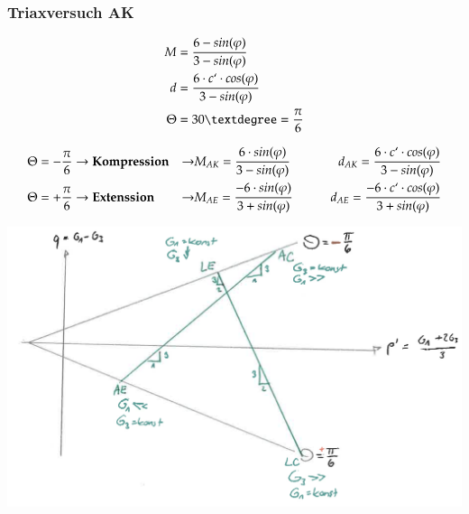 \begin{minipage}{0.3\linewidth}	
	\subsubsection{Triaxversuch AK}
	\begin{align*}
		M			&= \frac{6 - sin(\varphi)}{3 - sin(\varphi)} \\
		d			&= \frac{6 \cdot c`\cdot cos(\varphi)}{3 - sin(\varphi)} \\
		\Theta		&= 30° = \frac{\pi}{6} \\
	\end{align*}
\end{minipage}
\begin{minipage}{0.5\linewidth}
	\begin{align*}
		\Theta		&= - \frac{\pi}{6}
		\rightarrow \textbf{Kompression}
		&\rightarrow &M_{AK} = \frac{6 \cdot sin(\varphi)}{3 - sin(\varphi)}
		\qquad &d_{AK} = \frac{6 \cdot c`\cdot cos(\varphi)}{3 - sin(\varphi)} \\
		\Theta		&= + \frac{\pi}{6}
		\rightarrow \textbf{Extenssion}
		&\rightarrow &M_{AE} = \frac{- 6 \cdot sin(\varphi)}{3 + sin(\varphi)}
		\qquad &d_{AE} = \frac{- 6 \cdot c`\cdot cos(\varphi)}{3 + sin(\varphi)}
	\end{align*}
\end{minipage}

\begin{minipage}{\linewidth}
	\includegraphics[width=0.8\linewidth]{images/MC4triax.PNG}
\end{minipage}
 \clearpage